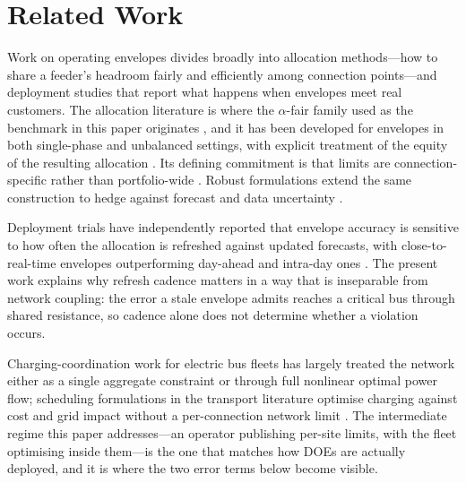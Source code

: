 \documentclass[lettersize,journal]{IEEEtran}
\begin{document}
\section{Related Work}\label{sec:related}
Work on operating envelopes divides broadly into allocation methods---how to
share a feeder's headroom fairly and efficiently among connection
points---and deployment studies that report what happens when envelopes meet
real customers. The allocation literature is where the $\alpha$-fair family
used as the benchmark in this paper originates \cite{mo2000fair}, and it has
been developed for envelopes in both single-phase and unbalanced settings, with
explicit treatment of the equity of the resulting allocation
\cite{gerdroodbari2022pq,alam2024allocation}. Its defining commitment is that
limits are connection-specific rather than portfolio-wide
\cite{petrou2021dol}. Robust formulations extend the same construction to
hedge against forecast and data uncertainty \cite{liu2024robustdoe}.

Deployment trials have independently reported that envelope accuracy is
sensitive to how often the allocation is refreshed against updated forecasts,
with close-to-real-time envelopes outperforming day-ahead and intra-day ones
\cite{aemo_edge}. The present work explains why refresh cadence matters in a
way that is inseparable from network coupling: the error a stale envelope
admits reaches a critical bus through shared resistance, so cadence alone does
not determine whether a violation occurs.

Charging-coordination work for electric bus fleets has largely treated the
network either as a single aggregate constraint or through full nonlinear
optimal power flow; scheduling formulations in the transport literature
optimise charging against cost and grid impact without a per-connection network
limit \cite{abdelwahed2020opportunity}. The intermediate regime this paper
addresses---an operator publishing per-site limits, with the fleet optimising
inside them---is the one that matches how DOEs are actually deployed, and it is
where the two error terms below become visible.
\end{document}
